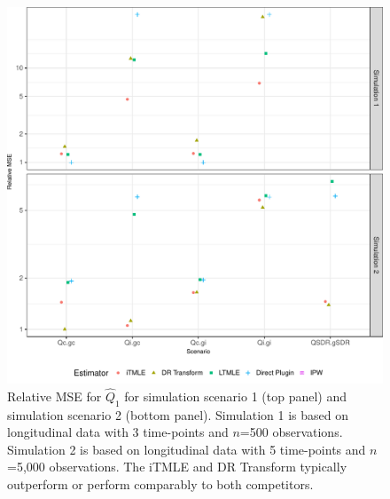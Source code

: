 \documentclass{article}\usepackage[]{graphicx}\usepackage[]{color}
\newenvironment{knitrout}{}{} %
\begin{document}
\begin{knitrout}
\color{fgcolor}\begin{figure}[H]

{\centering \includegraphics[width=.65\linewidth]{figure/plot-simres_all_MSE-1} 

}

\caption[Relative MSE for $\hat{Q}_1$ for simulation scenario 1 (top panel) and simulation scenario 2 (bottom panel)]{Relative MSE for $\hat{Q}_1$ for simulation scenario 1 (top panel) and simulation scenario 2 (bottom panel). Simulation 1 is based on longitudinal data with 3 time-points and $n$=500 observations. Simulation 2 is based on longitudinal data with 5 time-points and $n$=5,000 observations. The iTMLE and DR Transform typically outperform or perform comparably to both competitors.}\label{fig:simres.all.MSE}
\end{figure}


\end{knitrout}
\end{document}
